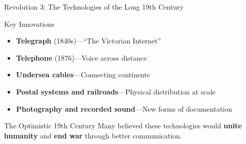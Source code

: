 \documentclass[aspectratio=169]{beamer}
\begin{document}
\begin{frame}{Revolution 3: The Technologies of the Long 19th Century}
\begin{block}{Key Innovations}
\begin{itemize}
  \item \textbf{Telegraph} (1840s)---``The Victorian Internet''
  \item \textbf{Telephone} (1876)---Voice across distance
  \item \textbf{Undersea cables}---Connecting continents
  \item \textbf{Postal systems and railroads}---Physical distribution at scale
  \item \textbf{Photography and recorded sound}---New forms of documentation
\end{itemize}
\end{block}

\vspace{0.3em}
\begin{exampleblock}{The Optimistic 19th Century}
Many believed these technologies would \textbf{unite humanity} and \textbf{end war} through better communication.
\end{exampleblock}

\vspace{0.3em}
\end{frame}
\end{document}
